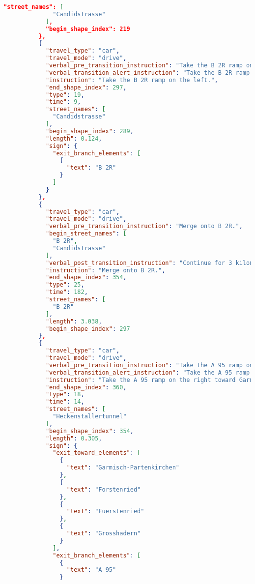 \begin{lstlisting}[language=json,breaklines=true]
            "street_names": [
              "Candidstrasse"
            ],
            "begin_shape_index": 219
          },
          {
            "travel_type": "car",
            "travel_mode": "drive",
            "verbal_pre_transition_instruction": "Take the B 2R ramp on the left.",
            "verbal_transition_alert_instruction": "Take the B 2R ramp on the left.",
            "instruction": "Take the B 2R ramp on the left.",
            "end_shape_index": 297,
            "type": 19,
            "time": 9,
            "street_names": [
              "Candidstrasse"
            ],
            "begin_shape_index": 289,
            "length": 0.124,
            "sign": {
              "exit_branch_elements": [
                {
                  "text": "B 2R"
                }
              ]
            }
          },
          {
            "travel_type": "car",
            "travel_mode": "drive",
            "verbal_pre_transition_instruction": "Merge onto B 2R.",
            "begin_street_names": [
              "B 2R",
              "Candidstrasse"
            ],
            "verbal_post_transition_instruction": "Continue for 3 kilometers.",
            "instruction": "Merge onto B 2R.",
            "end_shape_index": 354,
            "type": 25,
            "time": 182,
            "street_names": [
              "B 2R"
            ],
            "length": 3.038,
            "begin_shape_index": 297
          },
          {
            "travel_type": "car",
            "travel_mode": "drive",
            "verbal_pre_transition_instruction": "Take the A 95 ramp on the right toward Garmisch-Partenkirchen, Forstenried.",
            "verbal_transition_alert_instruction": "Take the A 95 ramp on the right.",
            "instruction": "Take the A 95 ramp on the right toward Garmisch-Partenkirchen/Forstenried/Fuerstenried/Grosshadern.",
            "end_shape_index": 360,
            "type": 18,
            "time": 14,
            "street_names": [
              "Heckenstallertunnel"
            ],
            "begin_shape_index": 354,
            "length": 0.305,
            "sign": {
              "exit_toward_elements": [
                {
                  "text": "Garmisch-Partenkirchen"
                },
                {
                  "text": "Forstenried"
                },
                {
                  "text": "Fuerstenried"
                },
                {
                  "text": "Grosshadern"
                }
              ],
              "exit_branch_elements": [
                {
                  "text": "A 95"
                }

\end{lstlisting}
